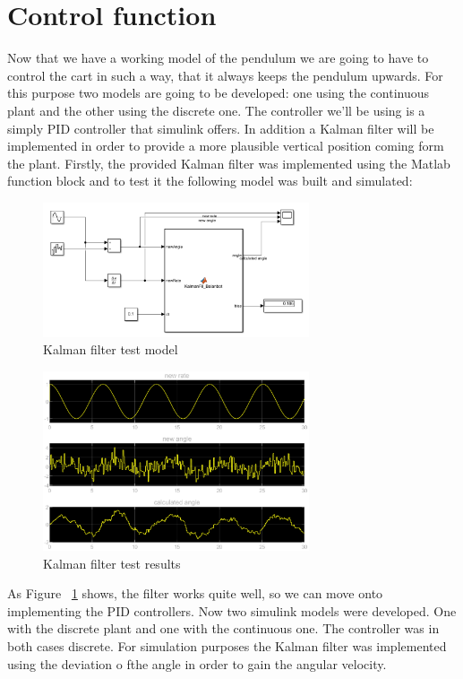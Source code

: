 \section{Control function}
Now that we have a working model of the pendulum we are going to have to control the cart in such a way, that it always keeps the pendulum upwards. For this purpose two models are going to be developed: one using the continuous plant and the other using the discrete one. The controller we'll be using is a simply PID controller that simulink offers. In addition a Kalman filter will be implemented in order to provide a more plausible vertical position coming form the plant.
Firstly, the provided Kalman filter was implemented using the Matlab function block and to test it the following model was built and simulated:
\begin{figure}[H]
		\centering
		\includegraphics[width=0.7\textwidth]{figures/kalman_test.png}
		\caption{Kalman filter test model}
		\label{fig:kalman_test}
\end{figure}
\begin{figure}[H]
		\centering
		\includegraphics[width=0.7\textwidth]{figures/kalman_test_results.eps}
		\caption{Kalman filter test results}
		\label{fig:kalman_test_results}
\end{figure}
As Figure ~\ref{fig:kalman_test} shows, the filter works quite well, so we can move onto implementing the PID controllers. Now two simulink models were developed. One with the discrete plant and one with the continuous one. The controller was in both cases discrete. For simulation purposes the Kalman filter was implemented using the deviation o fthe angle in order to gain the angular velocity.
